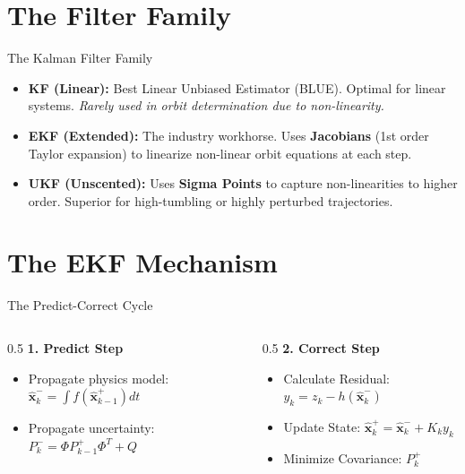 \documentclass{beamer}
\begin{document}
\section{The Filter Family}

\begin{frame}{The Kalman Filter Family}
    \begin{itemize}
        \item \textbf{KF (Linear):} Best Linear Unbiased Estimator (BLUE). Optimal for linear systems. \textit{Rarely used in orbit determination due to non-linearity.}
        \item \textbf{EKF (Extended):} The industry workhorse. Uses \textbf{Jacobians} (1st order Taylor expansion) to linearize non-linear orbit equations at each step.
        \item \textbf{UKF (Unscented):} Uses \textbf{Sigma Points} to capture non-linearities to higher order. Superior for high-tumbling or highly perturbed trajectories.
    \end{itemize}
\end{frame}

\section{The EKF Mechanism}

\begin{frame}{The Predict-Correct Cycle}
    \begin{columns}
        \begin{column}{0.5\textwidth}
            \textbf{1. Predict Step}
            \begin{itemize}
                \item Propagate physics model: $\hat{\mathbf{x}}_k^- = \int f(\hat{\mathbf{x}}_{k-1}^+) dt$
                \item Propagate uncertainty: $P_k^- = \Phi P_{k-1}^+ \Phi^T + Q$
            \end{itemize}
        \end{column}
        \begin{column}{0.5\textwidth}
            \textbf{2. Correct Step}
            \begin{itemize}
                \item Calculate Residual: $y_k = z_k - h(\hat{\mathbf{x}}_k^-)$
                \item Update State: $\hat{\mathbf{x}}_k^+ = \hat{\mathbf{x}}_k^- + K_k y_k$
                \item Minimize Covariance: $P_k^+$
            \end{itemize}
        \end{column}
    \end{columns}
\end{frame}
\end{document}
